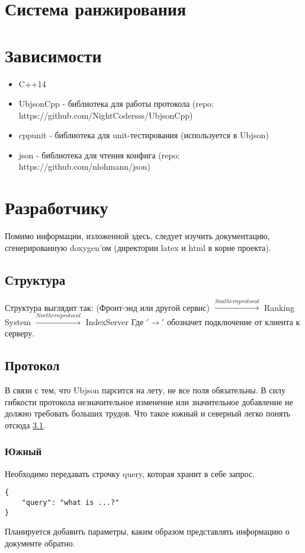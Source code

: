 \documentclass[12pt,a4paper]{article}
\begin{document}
\section{Система ранжирования}



\section{Зависимости}

\begin{itemize}
    \item C++14
    \item UbjsonCpp  - библиотека для работы протокола (repo: https://github.com/NightCodersss/UbjsonCpp)
    \item cppunit - библиотека для unit-тестирования (используется в Ubjson)
	\item json - библиотека для чтения конфига (repo: https://github.com/nlohmann/json)
\end{itemize}

\section{Разработчику}
Помимо информации, изложенной здесь, следует изучить документацию, сгенерированную doxygen'ом (директории latex и html в корне проекта).

\subsection{Структура}
\label{subsec:generalStructure}
Структура выглядит так:
(Фронт-энд или другой сервис) $\xrightarrow{Southern protocol}$ Ranking System $\xrightarrow{Northern protocol}$ IndexServer
Где $'\rightarrow'$ обозначет подключение от клиента к серверу.

\subsection{Протокол}
В связи с тем, что Ubjson парсится на лету, не все поля обязательны. 
В силу гибкости протокола незначительное изменение или значительное добавление не должно требовать больших трудов.
Что такое южный и северный легко понять отсюда \ref{subsec:generalStructure}.

\subsubsection{Южный}
Необходимо передавать строчку query, которая хранит в себе запрос.
\begin{verbatim}
{
	"query": "what is ...?"
}
\end{verbatim}
Планируется добавить параметры, каким образом представлять информацию о документе обратно.
\end{document}
